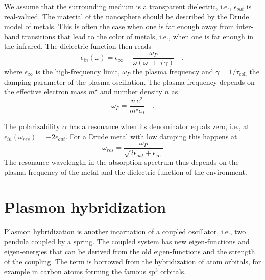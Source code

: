We  assume that the surrounding  medium  is a transparent dielectric, i.e., 
$\epsilon_{out}$ is real-valued. The material of the nanosphere should be described by the Drude model of metals. This is often the case when one is far enough away from inter-band transitions that lead to the color of metals, i.e., when one is far enough in the infrared. The dielectric function then reads
\begin{equation}
 \epsilon_{in} (\omega) = \epsilon_{\infty} - \frac{\omega_P}{ \omega \left(\omega \;
+ \; i\, \gamma \right) } \quad ,
\end{equation}
where $\epsilon_{\infty} $ is the  high-frequency limit, $\omega_P$ the plasma frequency and $\gamma = 1 / \tau_\text{coll} $ the damping parameter of the plasma oscillation. The plasma frequency depends on the effective electron mass $m^\star$ and number density $n$ as
\begin{equation}
\omega_P = \frac{n \, e^2}{m^\star \epsilon_0} \quad.
\end{equation}


The polarizability $\alpha$ has a resonance when its denominator equals zero, i.e., at $\epsilon_{in} (\omega_{res}) = -2 \epsilon_{out}$. For a Drude metal with low damping this happens at
\begin{equation}
\omega_{res} = \frac{\omega_P}{\sqrt{2 \epsilon_{out} + \epsilon_\infty}}
\end{equation}
The resonance wavelength in the absorption spectrum thus depends on 
the plasma frequency of the metal and  the dielectric function of the environment. 


\section{Plasmon hybridization}

Plasmon hybridization is another incarnation of a coupled oscillator, i.e., two pendula coupled by a spring. The coupled system has new eigen-functions and eigen-energies that can be derived from the old eigen-functions and the strength of the coupling. The term is borrowed from the hybridization of atom orbitals, for example in carbon atoms forming  the famous sp$^3$ orbitals.

